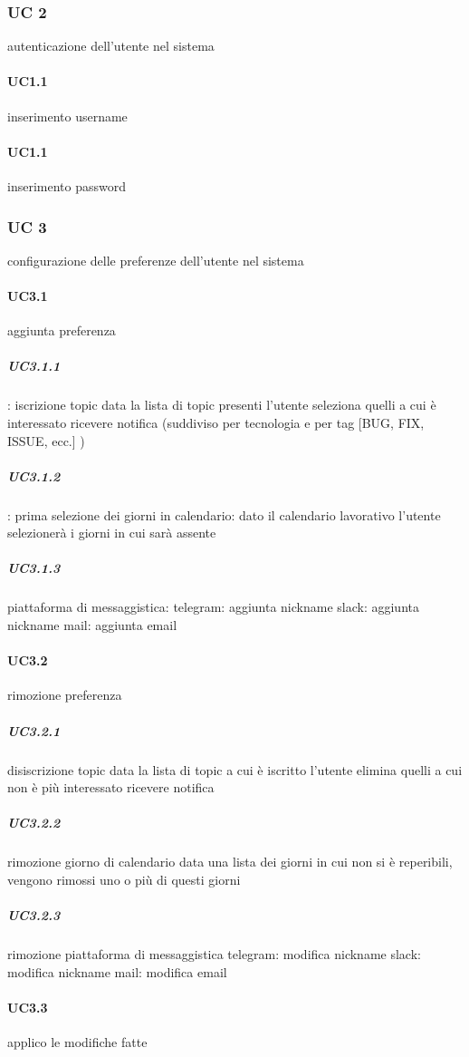 \subsubsection{UC 2}
autenticazione dell'utente nel sistema
	\paragraph{UC1.1}
	inserimento username
	\paragraph{UC1.1}
	inserimento password


\subsubsection{UC 3}
configurazione delle preferenze dell'utente nel sistema

	\paragraph{UC3.1}
	aggiunta preferenza
		\subparagraph{UC3.1.1}:
		iscrizione topic
			data la lista di topic presenti l'utente seleziona quelli a cui è interessato ricevere notifica (suddiviso per tecnologia e per tag [BUG, FIX, ISSUE, ecc.] )
		\subparagraph{UC3.1.2}:
		prima selezione dei giorni in calendario:
			dato il calendario lavorativo l'utente selezionerà i giorni in cui sarà assente
		\subparagraph{UC3.1.3}
		piattaforma di messaggistica:
			telegram: aggiunta nickname
			slack: aggiunta nickname
			mail: aggiunta email

	\paragraph{UC3.2}
	rimozione preferenza
		\subparagraph{UC3.2.1}
		disiscrizione topic
			data la lista di topic a cui è iscritto l'utente elimina quelli a cui non è più interessato ricevere notifica
		\subparagraph{UC3.2.2}
		rimozione giorno di calendario
			data una lista dei giorni in cui non si è reperibili, vengono rimossi uno o più di questi giorni
		\subparagraph{UC3.2.3}
		rimozione piattaforma di messaggistica
			telegram: modifica nickname
			slack: modifica nickname
			mail: modifica email
			
	\paragraph{UC3.3}
	applico le modifiche fatte
	
